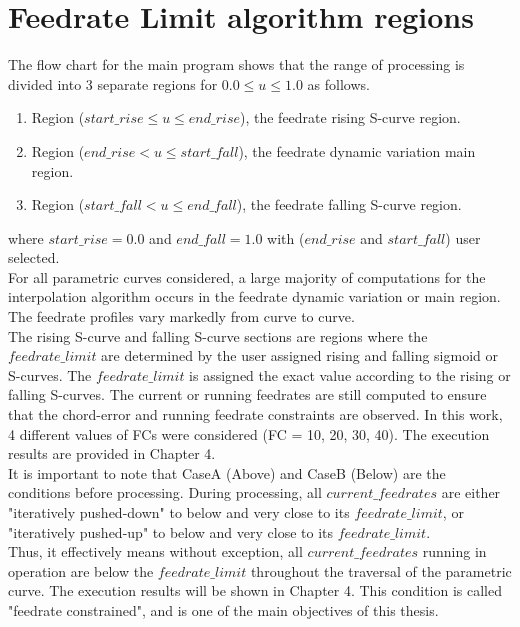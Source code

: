 \clearpage
\pagebreak
\section{Feedrate Limit algorithm regions}

\noindent The flow chart for the main program shows that the range of processing is divided into 3 separate regions for $0.0 \le u \le 1.0$ as follows.
\begin{enumerate}
	\item Region ($start\_rise \le u \le end\_rise$), the feedrate rising S-curve region.
	\item Region ($end\_rise < u \le start\_fall$), the feedrate dynamic variation main region.
	\item Region ($start\_fall < u \le end\_fall$), the feedrate falling S-curve region.
\end{enumerate}

\noindent where $start\_rise = 0.0$ and $end\_fall = 1.0$ with ($end\_rise$ and $start\_fall$) user selected.\\ 

\noindent For all parametric curves considered, a large majority of computations for the interpolation algorithm occurs in the feedrate dynamic variation or main region. The feedrate profiles vary markedly from curve to curve.\\

The rising S-curve and falling S-curve sections are regions where the $feedrate\_limit$ are determined by the user assigned rising and falling sigmoid or S-curves. The $feedrate\_limit$ is assigned the exact value according to the rising or falling S-curves. The current or running feedrates are still computed to ensure that the chord-error and running feedrate constraints are observed. In this work, 4 different values of FCs were considered (FC = 10, 20, 30, 40). The execution results are provided in Chapter 4.\\ 

It is important to note that CaseA (Above) and CaseB (Below) are the conditions before processing. During processing, all $current\_feedrates$ are either "iteratively pushed-down" to below and very close to its $feedrate\_limit$, or "iteratively pushed-up" to below and very close to its $feedrate\_limit$. \\

Thus, it effectively means without exception, all $current\_feedrates$ running in operation are below the $feedrate\_limit$ throughout the traversal of the parametric curve. The execution results will be shown in Chapter 4. This condition is called "feedrate constrained", and is one of the main objectives of this thesis.


